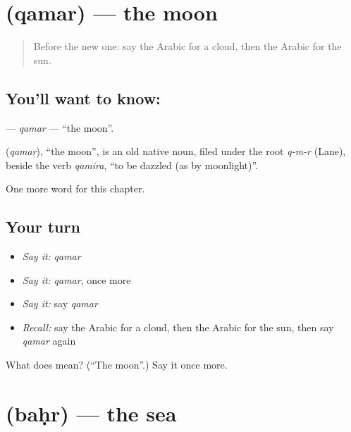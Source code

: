 \section[\texorpdfstring{\ar{قمر} (qamar)}{قمر (qamar)}]{ (qamar) — the moon}

\label{lesson:AR-C77-qamar}



\begin{quote}
Before the new one: say the Arabic for a cloud, then the Arabic for the sun.
\end{quote}

\subsection*{You'll want to know: }
\textbf{} — \emph{qamar} — \textquotedblleft{}the moon\textquotedblright{}.

\begin{cousinweb}
\textbf{} (\emph{qamar}), \textquotedblleft{}the moon\textquotedblright{}, is an old native noun, filed under the root \emph{q-m-r} (Lane), beside the verb \emph{qamira}, \textquotedblleft{}to be dazzled (as by moonlight)\textquotedblright{}.
\end{cousinweb}

\begin{grammarlens}[title={What you've built}]
One more word for this chapter.
\end{grammarlens}

\subsection*{Your turn}
\begin{itemize}
\raggedright
  \item \emph{Say it:} \emph{qamar}
  \item \emph{Say it:} \emph{qamar}, once more
  \item \emph{Say it:} say \emph{qamar}
  \item \emph{Recall:} say the Arabic for a cloud, then the Arabic for the sun, then say \emph{qamar} again
\end{itemize}

\begin{tcolorbox}[breakable,colback=teal!4,colframe=teal!35!black,title={Before you move on}]
What does  mean? (\textquotedblleft{}The moon\textquotedblright{}.) Say it once more.
\end{tcolorbox}
\section[\texorpdfstring{\ar{بحر} (baḥr)}{بحر (baḥr)}]{ (baḥr) — the sea}

